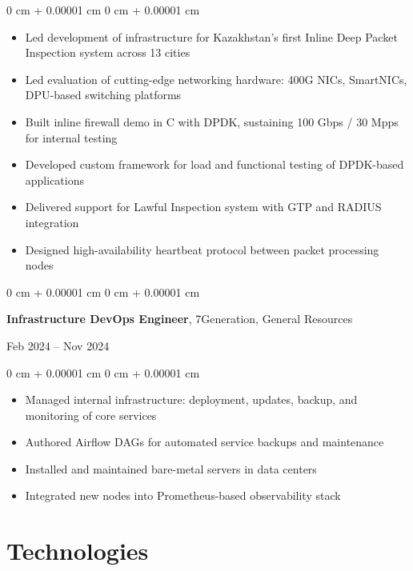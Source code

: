 \documentclass[10pt, letterpaper]{article}
\newenvironment{highlights}{
    \begin{itemize}[
        topsep=0.10 cm,
        parsep=0.10 cm,
        partopsep=0pt,
        itemsep=0pt,
        leftmargin=0 cm + 10pt
    ]
}{
    \end{itemize}
} %
\newenvironment{onecolentry}{
    \begin{adjustwidth}{
        0 cm + 0.00001 cm
    }{
        0 cm + 0.00001 cm
    }
}{
    \end{adjustwidth}
} %
\newenvironment{twocolentry}[2][]{
    \onecolentry
    \def\secondColumn{#2}
    \setcolumnwidth{\fill, 4.5 cm}
    \begin{paracol}{2}
}{
    \switchcolumn \raggedleft \secondColumn
    \end{paracol}
    \endonecolentry
} %
\begin{document}
\vspace{0.10 cm}
\begin{onecolentry}
    \begin{highlights}
        \item Led development of infrastructure for Kazakhstan’s first Inline Deep Packet Inspection system across 13 cities
        \item Led evaluation of cutting-edge networking hardware: 400G NICs, SmartNICs, DPU-based switching platforms
        \item Built inline firewall demo in C with DPDK, sustaining 100 Gbps / 30 Mpps for internal testing
        \item Developed custom framework for load and functional testing of DPDK-based applications
        \item Delivered support for Lawful Inspection system with GTP and RADIUS integration
        \item Designed high-availability heartbeat protocol between packet processing nodes
    \end{highlights}
\end{onecolentry}

\vspace{0.2 cm}

\begin{twocolentry}{
    Feb 2024 – Nov 2024
}
    \textbf{Infrastructure DevOps Engineer}, 7Generation, General Resources
\end{twocolentry}

\vspace{0.10 cm}
\begin{onecolentry}
    \begin{highlights}
        \item Managed internal infrastructure: deployment, updates, backup, and monitoring of core services
        \item Authored Airflow DAGs for automated service backups and maintenance
        \item Installed and maintained bare-metal servers in data centers
        \item Integrated new nodes into Prometheus-based observability stack
    \end{highlights}
\end{onecolentry}

\section{Technologies}
\end{document}
